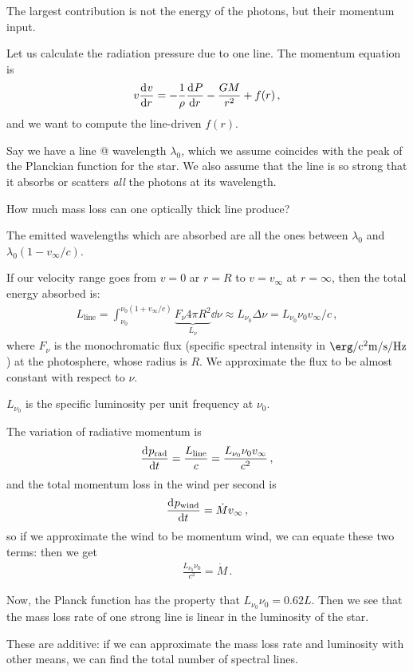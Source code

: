 \documentclass[main.tex]{subfiles}
\begin{document}

The largest contribution is not the energy of the photons, but their momentum input.

Let us calculate the radiation pressure due to one line. The momentum equation is 
%
\begin{align}
  v \dv[]{v}{r} = - \frac{1}{\rho } \dv[]{P}{r} - \frac{GM}{r^2} + f(r)
\,,
\end{align}
%
and we want to compute the line-driven \(f(r)\).

Say we have a line @ wavelength \(\lambda_0 \),  which we assume coincides with the peak of the Planckian function for the star.
We also assume that the line is so strong that it absorbs or scatters \emph{all} the photons at its wavelength.


How much mass loss can one optically thick line produce? 

The emitted wavelengths which are absorbed are all the ones between \(\lambda_0\) and \(\lambda_0 (1 - v_{\infty}/c)\).

If our velocity range goes from \(v=0\) ar \(r = R\) to \(v = v_{\infty}\) at \(r = \infty\), then the total energy absorbed is: 
%
\begin{align}
  L _{\text{line}} = \int _{\nu_0 }^{\nu_0 (1 + v_{\infty}/c)} \underbrace{F_\nu 4 \pi R^2}_{{L_{\nu}}} \dd{\nu } \approx L_{\nu_0 } \Delta \nu = L_{\nu_0 } \nu_0 v_{\infty} /c
\,,
\end{align}
%
where \(F_{\nu }\) is the monochromatic flux (specific spectral intensity in \(\SI{}{\erg\per\square\centi\metre\per\second\per\hertz}\)) at the photosphere, whose radius is \(R\).
We approximate the flux to be almost constant with respect to \(\nu \).

\(L_{\nu_0 }\) is the specific luminosity per unit frequency at \(\nu_0 \).

The variation of radiative momentum is 
%
\begin{align}
  \dv[]{p _{\text{rad}}}{t} = \frac{L _{\text{line}}}{c}
  = \frac{L_{\nu_0 } \nu_0 v_{\infty}}{c^2}
\,,
\end{align}
%
and the total momentum loss in the wind per second is 
%
\begin{align}
  \dv[]{p _{\text{wind}}}{t} = \dot{M} v_{\infty} 
\,,
\end{align}
%
so if we approximate the wind to be momentum wind, we can equate these two terms: then we get 
%
\begin{align}
  \frac{L_{\nu_0 } \nu_0}{c^2} = \dot{M} 
\,.
\end{align}

Now, the Planck function has the property that \(L_{\nu_0  } \nu_0 = 0.62 L\).
Then we see that the mass loss rate of one strong line is linear in the luminosity of the star.

These are additive: if we can approximate the mass loss rate and luminosity with other means, we can find the total number of spectral lines.
\end{document}
